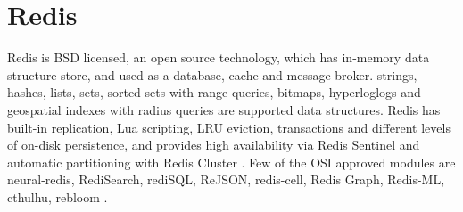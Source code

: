 \section{Redis}
Redis is BSD licensed, an open source technology, which has in-memory data structure store, and used as a database, cache and message broker. strings, hashes, lists, sets, sorted sets with range queries, bitmaps, hyperloglogs and geospatial indexes with radius queries are supported data structures. Redis has built-in replication, Lua scripting, LRU eviction, transactions and different levels of on-disk persistence, and provides high availability via Redis Sentinel and automatic partitioning with Redis Cluster \cite{Redis}.
Few of the OSI approved modules are neural-redis, RediSearch, rediSQL, ReJSON, redis-cell, Redis Graph, Redis-ML, cthulhu, rebloom \cite{Redis-Modules}.

